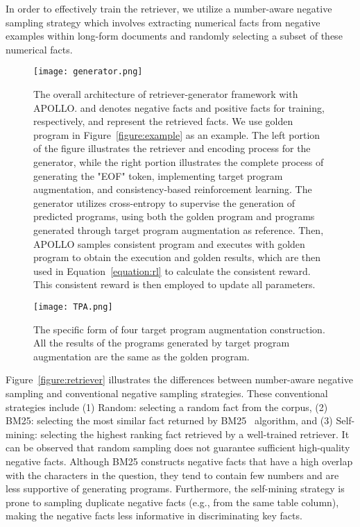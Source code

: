 \documentclass[11pt]{article}
\begin{document}
In order to effectively train the retriever, we utilize a number-aware negative sampling strategy which involves extracting numerical facts from negative examples within long-form documents and randomly selecting a subset of these numerical facts.


\begin{figure*}[t]
\centerline{\texttt{[image: generator.png]}}
    \caption{The overall architecture of retriever-generator framework with APOLLO.  and  denotes negative facts and positive facts for training, respectively, and  represent the retrieved facts. We use golden program in Figure~\ref{figure:example} as an example. The left portion of the figure illustrates the retriever and encoding process for the generator, while the right portion illustrates the complete process of generating the "EOF" token, implementing target program augmentation, and consistency-based reinforcement learning. The generator utilizes cross-entropy to supervise the generation of predicted programs, using both the golden program and programs generated through target program augmentation as reference. Then, APOLLO samples consistent program and executes with golden program to obtain the execution and golden results, which are then used in Equation~\ref{equation:rl} to calculate the consistent reward. This consistent reward is then employed to update all parameters.}
    \label{figure:generator}
\end{figure*}

\begin{figure}[t]
\centerline{\texttt{[image: TPA.png]}}
    \caption{The specific form of four target program augmentation construction. All the results of the programs generated by target program augmentation are the same as the golden program.}
    \label{figure:TPA}
\end{figure}


Figure~\ref{figure:retriever} illustrates the differences between number-aware negative sampling and conventional negative sampling strategies. These conventional strategies include (1) Random: selecting a random fact from the corpus, (2) BM25: selecting the most similar fact returned by BM25~\cite{bm25} algorithm, and (3) Self-mining: selecting the highest ranking fact retrieved by a well-trained retriever. It can be observed that random sampling does not guarantee sufficient high-quality negative facts. Although BM25 constructs negative facts that have a high overlap with the characters in the question, they tend to contain few numbers and are less supportive of generating programs. Furthermore, the self-mining strategy is prone to sampling duplicate negative facts (e.g., from the same table column), making the negative facts less informative in discriminating key facts.
\end{document}
